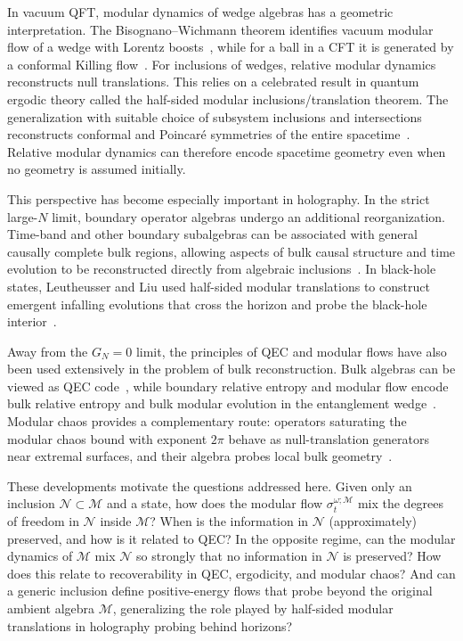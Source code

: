 \documentclass[a4paper,11pt]{article}
\theoremstyle{definition}
\newcommand{\mN}{\mathcal{N}}
\newcommand{\mM}{\mathcal{M}}
\begin{document}
In vacuum QFT, modular dynamics of wedge algebras has a geometric interpretation.  The Bisognano--Wichmann theorem identifies vacuum modular flow of a wedge with Lorentz boosts~\cite{BisognanoWichmann1975}, while for a ball in a CFT it is generated by a conformal Killing flow~\cite{CasiniHuertaMyers2011}. For inclusions of wedges, relative modular dynamics reconstructs null translations. This relies on a celebrated result in quantum ergodic theory called the 
half-sided modular inclusions/translation theorem. The generalization with suitable choice of subsystem inclusions and intersections reconstructs conformal and Poincar\'e symmetries of the entire spacetime~\cite{Wiesbrock1993,Borchers1992,Wiesbrock1993b,GuidoLongoWiesbrock1998,ArakiZsido2005}.  Relative modular dynamics can therefore encode spacetime geometry even when no geometry is assumed initially. 

This perspective has become especially important in holography. In the strict large-$N$ limit, boundary operator algebras undergo an additional reorganization.  Time-band and other boundary subalgebras can be associated with general causally complete bulk regions, allowing aspects of bulk causal structure and time evolution to be reconstructed directly from algebraic inclusions~\cite{LeutheusserLiuSubregion}.  In black-hole states, Leutheusser and Liu used half-sided modular translations to construct emergent infalling evolutions that cross the horizon and probe the black-hole interior~\cite{LeutheusserLiuCausal,LeutheusserLiu2023}.

Away from the $G_N=0$ limit, the principles of QEC and modular flows have also been used extensively in the problem of bulk reconstruction. Bulk algebras can be viewed as QEC code~\cite{AlmheiriDongHarlow2015}, while boundary relative entropy and modular flow encode bulk relative entropy and bulk modular evolution in the entanglement wedge~\cite{JafferisLewkowyczMaldacenaSuh2016}.  Modular chaos provides a complementary route: operators saturating the modular chaos bound with exponent $2\pi$ behave as null-translation generators near extremal surfaces, and their algebra probes local bulk geometry~\cite{deBoerLamprou2020,faulkner2019modular}. 

These developments motivate the questions addressed here.  Given only an inclusion $\mN\subset\mM$ and a state, how does the modular flow $\sigma_t^{\omega;\mM}$ mix the degrees of freedom in $\mN$ inside $\mM$? When is the information in $\mN$ (approximately) preserved, and how is it related to QEC? In the opposite regime, can the modular dynamics of $\mM$ mix $\mN$ so strongly that no information in $\mN$ is preserved? How does this relate to recoverability in QEC, ergodicity, and modular chaos?  And can a generic inclusion define positive-energy flows that probe beyond the original ambient algebra $\mM$, generalizing the role played by half-sided modular translations in holography probing behind horizons?
\end{document}
